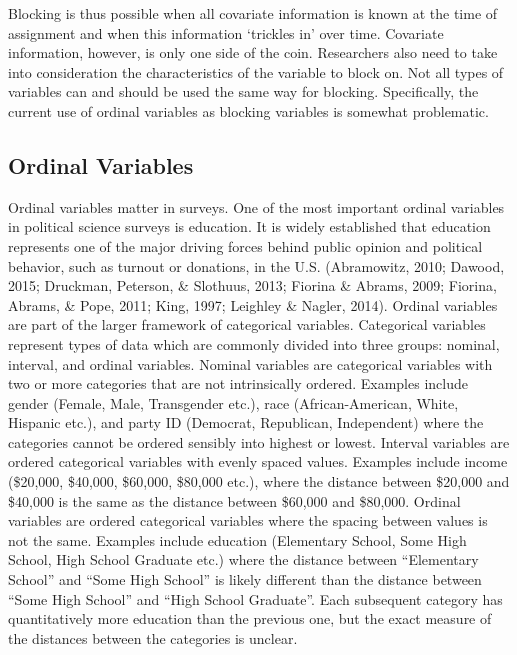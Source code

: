 \documentclass[12pt,econ]{sources/authesis}
\begin{document}
Blocking is thus possible when all covariate information is known at the time of assignment and when this information `trickles in' over time. Covariate information, however, is only one side of the coin. Researchers also need to take into consideration the characteristics of the variable to block on. Not all types of variables can and should be used the same way for blocking. Specifically, the current use of ordinal variables as blocking variables is somewhat problematic.

\hypertarget{ordblock-theory-ordinal}{%
\subsection{Ordinal Variables}\label{ordblock-theory-ordinal}}

Ordinal variables matter in surveys. One of the most important ordinal variables in political science surveys is education. It is widely established that education represents one of the major driving forces behind public opinion and political behavior, such as turnout or donations, in the U.S. (Abramowitz, 2010; Dawood, 2015; Druckman, Peterson, \& Slothuus, 2013; Fiorina \& Abrams, 2009; Fiorina, Abrams, \& Pope, 2011; King, 1997; Leighley \& Nagler, 2014). Ordinal variables are part of the larger framework of categorical variables. Categorical variables represent types of data which are commonly divided into three groups: nominal, interval, and ordinal variables. Nominal variables are categorical variables with two or more categories that are not intrinsically ordered. Examples include gender (Female, Male, Transgender etc.), race (African-American, White, Hispanic etc.), and party ID (Democrat, Republican, Independent) where the categories cannot be ordered sensibly into highest or lowest. Interval variables are ordered categorical variables with evenly spaced values. Examples include income (\$20,000, \$40,000, \$60,000, \$80,000 etc.), where the distance between \$20,000 and \$40,000 is the same as the distance between \$60,000 and \$80,000. Ordinal variables are ordered categorical variables where the spacing between values is not the same. Examples include education (Elementary School, Some High School, High School Graduate etc.) where the distance between ``Elementary School'' and ``Some High School'' is likely different than the distance between ``Some High School'' and ``High School Graduate''. Each subsequent category has quantitatively more education than the previous one, but the exact measure of the distances between the categories is unclear.
\end{document}

